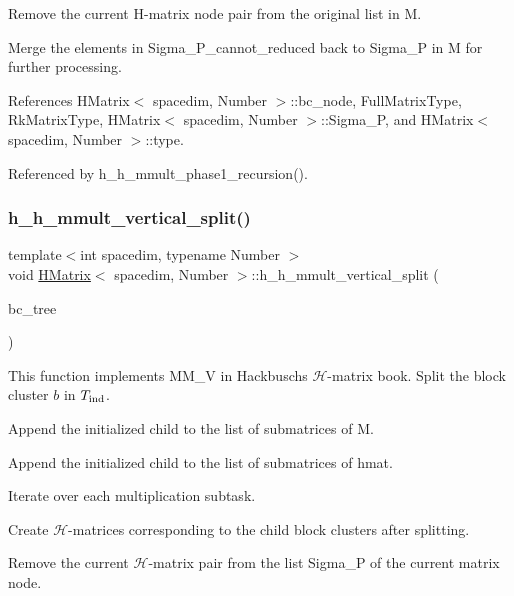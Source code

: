 Remove the current H-\/matrix node pair from the original list in {\ttfamily M}.

Merge the elements in {\ttfamily Sigma\+\_\+\+P\+\_\+cannot\+\_\+reduced} back to {\ttfamily Sigma\+\_\+P} in {\ttfamily M} for further processing.

References H\+Matrix$<$ spacedim, Number $>$\+::bc\+\_\+node, Full\+Matrix\+Type, Rk\+Matrix\+Type, H\+Matrix$<$ spacedim, Number $>$\+::\+Sigma\+\_\+P, and H\+Matrix$<$ spacedim, Number $>$\+::type.



Referenced by h\+\_\+h\+\_\+mmult\+\_\+phase1\+\_\+recursion().

\mbox{\label{classHMatrix_a253c23d09e89a9a37a7d808374b5ae4e}} 
\subsubsection{\texorpdfstring{h\+\_\+h\+\_\+mmult\+\_\+vertical\+\_\+split()}{h\_h\_mmult\_vertical\_split()}}
{\footnotesize\ttfamily template$<$int spacedim, typename Number $>$ \\
void \hyperlink{classHMatrix}{H\+Matrix}$<$ spacedim, Number $>$\+::h\+\_\+h\+\_\+mmult\+\_\+vertical\+\_\+split (\begin{DoxyParamCaption}\item[{\hyperlink{classBlockClusterTree}{Block\+Cluster\+Tree}$<$ spacedim, Number $>$ \&}]{bc\+\_\+tree }\end{DoxyParamCaption})}

This function implements {\ttfamily M\+M\+\_\+V} in Hackbusch\textquotesingle{}s $\mathcal{H}$-\/matrix book. Split the block cluster $b$ in $T_{\rm ind}$.

Append the initialized child to the list of submatrices of {\ttfamily M}.

Append the initialized child to the list of submatrices of {\ttfamily hmat}.

Iterate over each multiplication subtask.

Create $\mathcal{H}$-\/matrices corresponding to the child block clusters after splitting.

Remove the current $\mathcal{H}$-\/matrix pair from the list {\ttfamily Sigma\+\_\+P} of the current matrix node.

